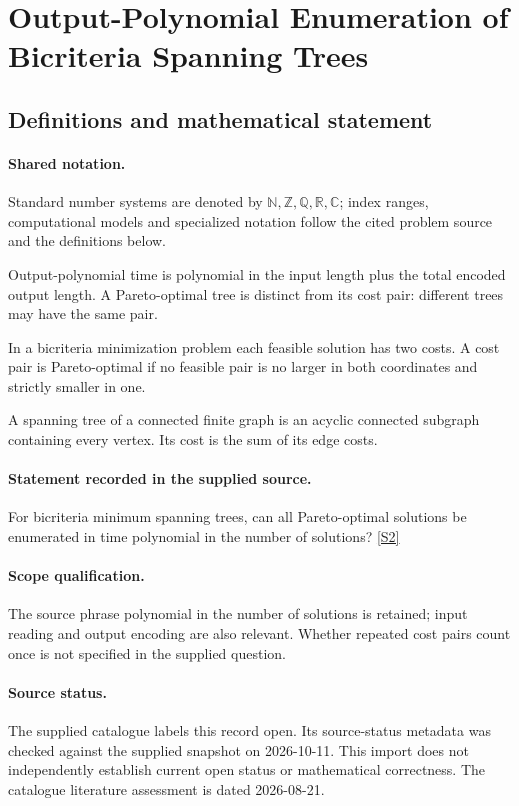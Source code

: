 \documentclass[11pt]{article}
\newcommand{\sref}[2]{\hyperlink{source:#1:#2}{[S#2]}}
\begin{document}
\section{Output-Polynomial Enumeration of Bicriteria Spanning Trees}\label{statement}

\subsection{Definitions and mathematical statement}

\paragraph{Shared notation.}Standard number systems are denoted by $\mathbb N,\mathbb Z,\mathbb Q,\mathbb R,\mathbb C$; index ranges, computational models and specialized notation follow the cited problem source and the definitions below.


Output-polynomial time is polynomial in the input length plus the total encoded output length. A Pareto-optimal tree is distinct from its cost pair: different trees may have the same pair.

In a bicriteria minimization problem each feasible solution has two costs. A cost pair is Pareto-optimal if no feasible pair is no larger in both coordinates and strictly smaller in one.

A spanning tree of a connected finite graph is an acyclic connected subgraph containing every vertex. Its cost is the sum of its edge costs.
\paragraph{Statement recorded in the supplied source.}
For bicriteria minimum spanning trees, can all Pareto-optimal solutions be enumerated in time polynomial in the number of solutions? \sref{statement}{2}
\paragraph{Scope qualification.}
The source phrase polynomial in the number of solutions is retained; input reading and output encoding are also relevant. Whether repeated cost pairs count once is not specified in the supplied question.
\paragraph{Source status.}
The supplied catalogue labels this record open. Its source-status metadata was checked against the supplied snapshot on 2026-10-11. This import does not independently establish current open status or mathematical correctness. The catalogue literature assessment is dated 2026-08-21.
\end{document}
